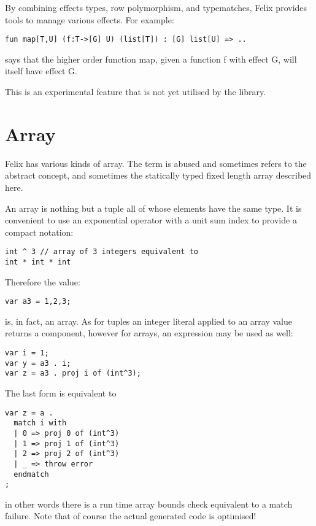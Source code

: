 \documentclass[oneside]{book}
\begin{document}
By combining effects types, row polymorphism, and typematches,
Felix provides tools to manage various effects. For example:

\begin{verbatim}
fun map[T,U] (f:T->[G] U) (list[T]) : [G] list[U] => ..
\end{verbatim}

says that the higher order function map, given a function f
with effect G, will itself have effect G.

This is an experimental feature that is not yet utilised by
the library.

\section{Array}
Felix has various kinds of array. The term is abused and sometimes
refers to the abstract concept, and sometimes the statically
typed fixed length array described here.

An array is nothing but a tuple all of whose elements have the
same type. It is convenient to use an exponential operator with
a  unit sum index to provide a compact notation:

\begin{verbatim}
int ^ 3 // array of 3 integers equivalent to
int * int * int
\end{verbatim}

Therefore the value:

\begin{verbatim}
var a3 = 1,2,3;
\end{verbatim}

is, in fact, an array. As for tuples an integer literal applied
to an array value returns a component, however for arrays,
an expression may be used as well:

\begin{verbatim}
var i = 1;
var y = a3 . i;
var z = a3 . proj i of (int^3);
\end{verbatim}

The last form is equivalent to

\begin{verbatim}
var z = a . 
  match i with
  | 0 => proj 0 of (int^3)
  | 1 => proj 1 of (int^3)
  | 2 => proj 2 of (int^3)
  | _ => throw error
  endmatch
;
\end{verbatim}

in other words there is a run time array bounds check equivalent to a match failure.
Note that of course the actual generated code is optimised!
\end{document}
